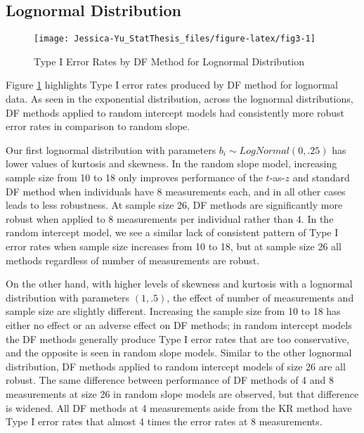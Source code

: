 \documentclass[12pt, twoside]{amherstthesis}
\begin{document}
\hypertarget{lognormal-distribution}{%
\subsection{Lognormal Distribution}\label{lognormal-distribution}}
\begin{figure}

{\centering \texttt{[image: Jessica-Yu\_StatThesis\_files/figure-latex/fig3-1]} 

}

\caption{Type I Error Rates by DF Method for Lognormal Distribution}\label{fig:fig3}
\end{figure}
Figure \ref{fig:fig3} highlights Type I error rates produced by DF method for lognormal data. As seen in the exponential distribution, across the lognormal distributions, DF methods applied to random intercept models had consistently more robust error rates in comparison to random slope.

Our first lognormal distribution with parameters \(b_i \sim LogNormal(0,.25)\) has lower values of kurtosis and skewness. In the random slope model, increasing sample size from 10 to 18 only improves performance of the \(t\)-as-\(z\) and standard DF method when individuals have 8 measurements each, and in all other cases leads to less robustness. At sample size 26, DF methods are significantly more robust when applied to 8 measurements per individual rather than 4. In the random intercept model, we see a similar lack of consistent pattern of Type I error rates when sample size increases from 10 to 18, but at sample size 26 all methods regardless of number of measurements are robust.

On the other hand, with higher levels of skewness and kurtosis with a lognormal distribution with parameters \((1,.5)\), the effect of number of measurements and sample size are slightly different. Increasing the sample size from 10 to 18 has either no effect or an adverse effect on DF methods; in random intercept models the DF methods generally produce Type I error rates that are too conservative, and the opposite is seen in random slope models. Similar to the other lognormal distribution, DF methods applied to random intercept models of size 26 are all robust. The same difference between performance of DF methods of 4 and 8 measurements at size 26 in random slope models are observed, but that difference is widened. All DF methods at 4 measurements aside from the KR method have Type I error rates that almost 4 times the error rates at 8 measurements.
\end{document}
